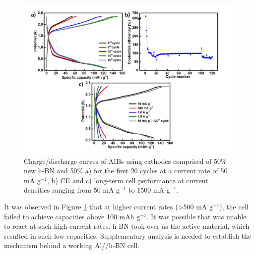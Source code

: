 \begin{figure}[tbh!]
\centering
\includegraphics[width=\textwidth]{Figures/BOhBN/hBNBO5050}
\caption{Charge/discharge curves of AIBs using cathodes comprised of 50\% new h-BN and 50\%  a) for the first 20 cycles at a current rate of 50 mA g$^{-1}$, b) CE and c) long-term cell performance at current densities ranging from 50 mA g$^{-1}$ to 1500 mA g$^{-1}$.}
\label{Figures/BOhBN:hBNBO5050}
\end{figure}
It was observed in Figure \ref{Figures/BOhBN:hBNBO5050} that at higher current rates (>500 mA g$^{-1}$), the cell failed to achieve capacities above 100 mAh g$^{-1}$. It was possible that  was unable to react at such high current rates. h-BN took over as the active material, which resulted in such low capacities. Supplementary analysis is needed to establish the mechanism behind a working Al//h-BN cell. 
 

